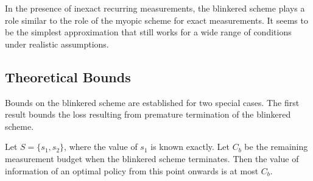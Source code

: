 In the presence of inexact recurring measurements, the blinkered
scheme plays a role similar to the role of the myopic scheme for exact
measurements. It seems to be the simplest approximation that still
works for a wide range of conditions under realistic assumptions.

% 

\subsection{Theoretical Bounds}

Bounds on the blinkered scheme are established for two special cases.
The first result bounds the loss resulting from premature termination
of the blinkered scheme.

\begin{thm}
\label{th:bound-single} 
Let $S=\{ s_1, s_2\} $, where the value of $s_1$ is known exactly. Let
$C_b$ be the remaining measurement budget when the blinkered
scheme terminates. Then the value of information of an optimal
policy from this point onwards is at most $C_b$.
\end{thm}
